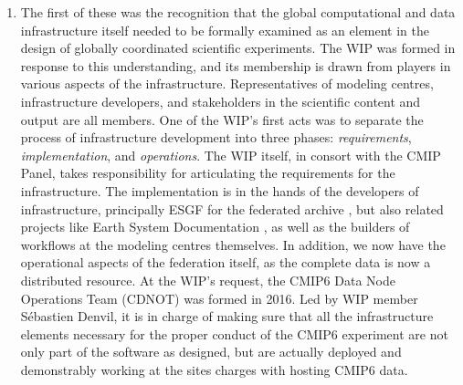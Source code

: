 \documentclass[gmd,manuscript]{copernicus}
\newcommand{\pipref}[1] {\citep{ref:#1}}
\begin{document}
\begin{enumerate}
\item The first of these was the recognition that the global
  computational and data infrastructure itself needed to be formally
  examined as an element in the design of globally coordinated
  scientific experiments. The WIP was formed in response to this
  understanding, and its membership is drawn from players in various
  aspects of the infrastructure. Representatives of modeling centres,
  infrastructure developers, and stakeholders in the scientific
  content and output are all members. One of the WIP's first acts was
  to separate the process of infrastructure development into three
  phases: \emph{requirements}, \emph{implementation}, and
  \emph{operations}. The WIP itself, in consort with the CMIP Panel,
  takes responsibility for articulating the requirements for the
  infrastructure. The implementation is in the hands of the developers
  of infrastructure, principally ESGF for the federated archive
  \pipref{williamsetal2015}, but also related projects like Earth
  System Documentation
  \citep[\href{https://goo.gl/WNwKD9}{ES-DOC},][]{ref:guilyardietal2013},
  as well as the builders of workflows at the modeling centres
  themselves. In addition, we now have the operational aspects of the
  federation itself, as the complete data is now a distributed
  resource. At the WIP's request, the CMIP6 Data Node Operations Team
  (CDNOT) was formed in 2016. Led by WIP member S\'ebastien Denvil, it
  is in charge of making sure that all the infrastructure elements
  necessary for the proper conduct of the CMIP6 experiment are not
  only part of the software as designed, but are actually deployed and
  demonstrably working at the sites charges with hosting CMIP6 data.


\end{enumerate}
\end{document}
